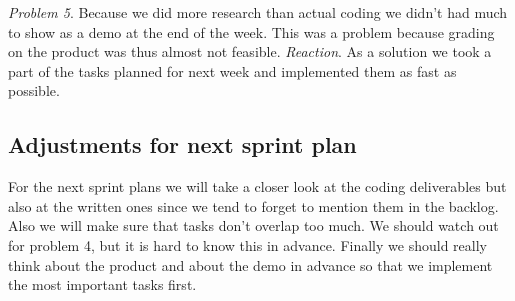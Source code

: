 \documentclass{scrartcl}
\begin{document}
\emph{Problem 5}. Because we did more research than actual coding we didn't had much to show as a demo at the end of the week. This was a problem because grading on the product was thus almost not feasible.
\emph{Reaction}. As a solution we took a part of the tasks planned for next week and implemented them as fast as possible.

\subsection{Adjustments for next sprint plan}
For the next sprint plans we will take a closer look at the coding deliverables but also at the written ones since we tend to forget to mention them in the backlog.
Also we will make sure that tasks don't overlap too much.
We should watch out for problem 4, but it is hard to know this in advance.
Finally we should really think about the product and about the demo in advance so that we implement the most important tasks first.
\end{document}

